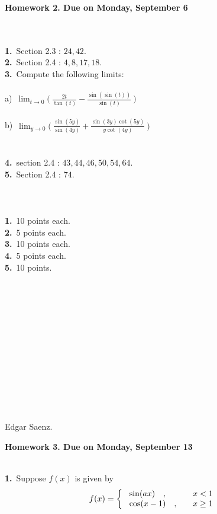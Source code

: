 \documentclass[12pt]{article}
\newcommand{\ds}{\displaystyle}
\newcommand{\Frac}{\displaystyle \frac}
\begin{document}
\begin{center}
\textbf{Homework 2. Due on Monday, September 6} \\
\end{center}\
\\
\\
\textbf{1.}\ Section 2.3 : $24,42$.\\
\textbf{2.}\ Section 2.4 : $4,8,17,18$.\\
\textbf{3.}\ Compute the following limits:\\
\\
a)\
$\ds\lim_{t\to0}\Big(\ \Frac{2t}{\tan(t)}-\Frac{\sin(\sin(t))}{\sin(t)}\ \Big)$\\
\\
b)\
$\ds\lim_{y\to0}\Big(\ \Frac{\sin(5y)}{\sin(4y)}+\Frac{\sin(3y)\cot(5y)}{y\cot(4y)}\ \Big)$\\
\\
\\
\textbf{4.}\ section 2.4 : $43,44,46,50,54,64$.\\
\textbf{5.}\ Section 2.4 : $74$.\\
\\
\\
\\
\textbf{1.}\ 10 points each.\\
\textbf{2.}\  5 points each.\\
\textbf{3.}\ 10 points each.\\
\textbf{4.}\  5 points each.\\
\textbf{5.}\ 10 points.\\
\\\\\\\\\\\\\\\\\\\\\\\\
\begin{flushright}
Edgar Saenz.
\end{flushright}
\newpage
\begin{center}
\textbf{Homework 3. Due on Monday, September 13} \\
\end{center}\
\\
\textbf{1.}\ Suppose $f(x)$ is given by
$$f(x)=\left\{ \begin{array}{ll}
              \ \sin(ax)\   \    \ ,& \  \  \  \hbox{$ x< 1$}
              \\
              \ \cos(x-1)  \   \   \ , & \   \   \   \hbox{$x\geq1$}
                \end{array}
            \right. $$\\
\end{document}

